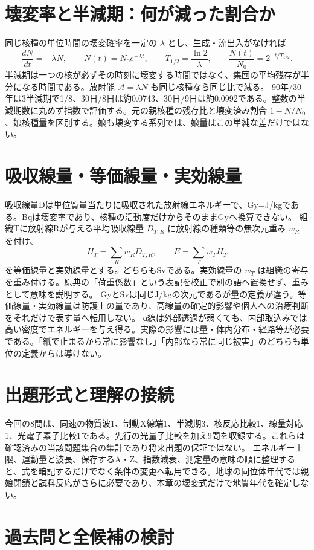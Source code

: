 \section{壊変率と半減期：何が減った割合か}\label{theory:modern:decay}
同じ核種の単位時間の壊変確率を一定の \(\lambda\) とし、生成・流出入がなければ
\[
 \frac{dN}{dt}=-\lambda N,\qquad
 N(t)=N_0e^{-\lambda t},\qquad
 T_{1/2}=\frac{\ln2}{\lambda},\qquad
 \frac{N(t)}{N_0}=2^{-t/T_{1/2}}.
\]
半減期は一つの核が必ずその時刻に壊変する時間ではなく、集団の平均残存が半分になる時間である。放射能 \(\mathcal A=\lambda N\) も同じ核種なら同じ比で減る。
90年/30年は3半減期で1/8、30日/8日は約0.0743、30日/9日は約0.0992である。整数の半減期数に丸めず指数で評価する。元の親核種の残存比と壊変済み割合 \(1-N/N_0\)、娘核種量を区別する。娘も壊変する系列では、娘量はこの単純な差だけではない\cite{modern_mit_nuclear}。

\section{吸収線量・等価線量・実効線量}\label{theory:modern:dose}\label{theory:modern:activity}
吸収線量Dは単位質量当たりに吸収された放射線エネルギーで、Gy=J/kgである。Bqは壊変率であり、核種の活動度だけからそのままGyへ換算できない。
組織Tに放射線Rが与える平均吸収線量 \(D_{T,R}\) に放射線の種類等の無次元重み \(w_R\) を付け、
\[
 H_T=\sum_Rw_RD_{T,R},\qquad E=\sum_Tw_TH_T
\]
を等価線量と実効線量とする。どちらもSvである。実効線量の \(w_T\) は組織の寄与を重み付ける。原典の「荷重係数」という表記を校正で別の語へ置換せず、重みとして意味を説明する。
GyとSvは同じJ/kgの次元であるが量の定義が違う。等価線量・実効線量は防護上の量であり、高線量の確定的影響や個人への治療判断をそれだけで表す量へ転用しない。
α線は外部透過が弱くても、内部取込みでは高い密度でエネルギーを与え得る。実際の影響には量・体内分布・経路等が必要である。「紙で止まるから常に影響なし」「内部なら常に同じ被害」のどちらも単位の定義からは導けない\cite{modern_dose,modern_alpha}。

\section{出題形式と理解の接続}
今回の8問は、同速の物質波1、制動X線端1、半減期3、核反応比較1、線量対応1、光電子素子比較1である。先行の光量子比較を加え9問を収録する。これらは確認済みの当該問題集合の集計であり将来出題の保証ではない。
エネルギー上限、運動量と波長、保存するA・Z、指数減衰、測定量の意味の順に整理すると、式を暗記するだけでなく条件の変更へ転用できる。地球の同位体年代では親娘閉鎖と試料反応がさらに必要であり、本章の壊変式だけで地質年代を確定しない。

\section{過去問と全候補の検討}

